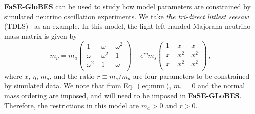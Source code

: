 \documentclass[aps,prd,nofootinbib,preprint]{revtex4}
\begin{document}
\textbf{FaSE-GloBES} can be used to study how model parameters are constrained by simulated neutrino oscillation experiments. We take \textit{the tri-direct littlest seesaw} (TDLS)~\cite{King:2013iva,King:2015dvf,King:2016yvg} as an example. In this model, the light left-handed Majorana neutrino mass matrix is given by
\begin{equation}
\label{eq:mnu}  m_{\nu}=m_{a}\begin{pmatrix}
 1 &~ \omega  &~ \omega ^2 \\
 \omega  &~ \omega ^2 &~ 1 \\
 \omega ^2 &~ 1 &~ \omega  \\
\end{pmatrix}+e^{i\eta}m_{s}
\begin{pmatrix}
 1 &~  x &~  x \\
 x &~ x^2 &~ x^2 \\
 x &~ x^2 &~ x^2 \\
\end{pmatrix}\,,
\end{equation}
where $x$, $\eta$, $m_a$, and the ratio $r\equiv m_s/m_a$ are four parameters to be constrained by simulated data. We note that from Eq.~(\ref{eq:mnu}), $m_1=0$ and the normal mass ordering are imposed, and will need to be imposed in \textbf{FaSE-GLoBES}. Therefore, the restrictions in this model are $m_a>0$ and $r>0$.
\end{document}

